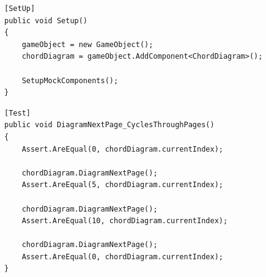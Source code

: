 \begin{lstlisting}[style=sharpcstyle,caption=Funkcja \texttt{Setup}, label=lst:70]
[SetUp]
public void Setup()
{
    gameObject = new GameObject();
    chordDiagram = gameObject.AddComponent<ChordDiagram>();

    SetupMockComponents();
}
\end{lstlisting}

\begin{lstlisting}[style=sharpcstyle,caption=Funkcja \texttt{DiagramNextPage\_CyclesThroughPages}, label=lst:80]
[Test]
public void DiagramNextPage_CyclesThroughPages()
{
    Assert.AreEqual(0, chordDiagram.currentIndex);

    chordDiagram.DiagramNextPage();
    Assert.AreEqual(5, chordDiagram.currentIndex);

    chordDiagram.DiagramNextPage();
    Assert.AreEqual(10, chordDiagram.currentIndex);

    chordDiagram.DiagramNextPage();
    Assert.AreEqual(0, chordDiagram.currentIndex);
}
\end{lstlisting}